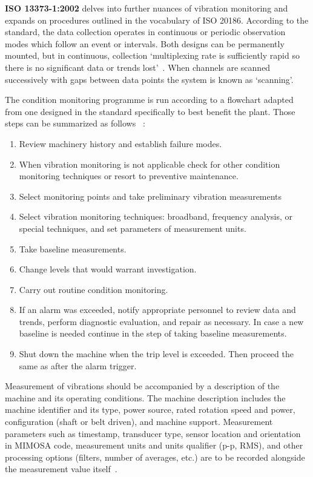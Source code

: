 \textbf{ISO 13373-1:2002} delves into further nuances of vibration monitoring and expands on procedures outlined in the vocabulary of ISO 20186. According to the standard, the data collection operates in continuous or periodic observation modes which follow an event or intervals. Both designs can be permanently mounted, but in continuous, collection `multiplexing rate is sufficiently rapid so there is no significant data or trends lost'~\cite{noauthor_iso_2002}.  When channels are scanned successively with gaps between data points the system is known as `scanning'.

The condition monitoring programme is run according to a flowchart adapted from one designed in the standard specifically to best benefit the plant. Those steps can be summarized as follows ~\cite{noauthor_iso_2002}:
\begin{enumerate}
\itemsep0pt
\item Review machinery history and establish failure modes.
\item When vibration monitoring is not applicable check for other condition monitoring techniques or resort to preventive maintenance.
\item Select monitoring points and take preliminary vibration measurements
\item Select vibration monitoring techniques: broadband, frequency analysis, or special techniques, and set parameters of measurement units.
\item Take baseline measurements.
\item Change levels that would warrant investigation.
\item Carry out routine condition monitoring.
\item If an alarm was exceeded, notify appropriate personnel to review data and trends, perform diagnostic evaluation, and repair as necessary. In case a new baseline is needed continue in the step of taking baseline measurements.
\item Shut down the machine when the trip level is exceeded. Then proceed the same as after the alarm trigger.
\end{enumerate}

Measurement of vibrations should be accompanied by a description of the machine and its operating conditions. The machine description includes the machine identifier and its type, power source, rated rotation speed and power, configuration (shaft or belt driven), and machine support. Measurement parameters such as timestamp, transducer type, sensor location and orientation in MIMOSA code, measurement units and units qualifier (p-p, RMS), and other processing options (filters, number of averages, etc.) are to be recorded alongside the measurement value itself~\cite{noauthor_iso_2002}.

